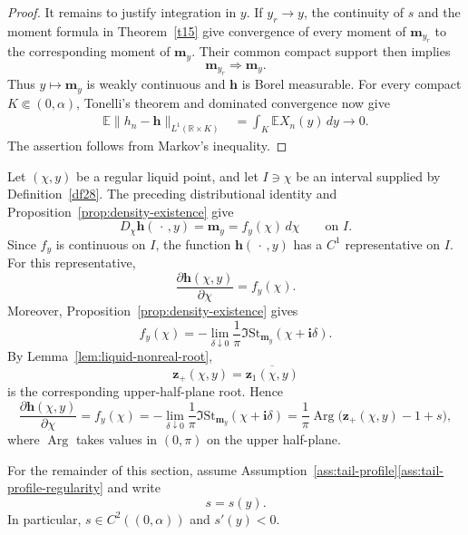 \documentclass[11pt]{amsart}
\theoremstyle{plain}
\numberwithin{equation}{section}
\numberwithin{theorem}{section}
\numberwithin{figure}{section}
\begin{document}
\begin{proof}
It remains to justify integration in \(y\). If \(y_r\to y\), the
continuity of \(s\) and the moment formula in Theorem~\ref{t15} give
convergence of every moment of \(\mathbf m_{y_r}\) to the corresponding
moment of \(\mathbf m_y\). Their common compact support then implies
\[
    \mathbf m_{y_r}\Longrightarrow\mathbf m_y.
\]
Thus \(y\mapsto\mathbf m_y\) is weakly continuous and
\(\mathbf h\) is Borel measurable. For every compact
\(K\Subset(0,\alpha)\), Tonelli's theorem and dominated convergence
now give
\[
\begin{aligned}
    \mathbb E
    \lVert h_n-\mathbf h\rVert_{L^1(\mathbb R\times K)}
    &=
    \int_K\mathbb E X_n(y)\,dy
    \longrightarrow0.
\end{aligned}
\]
The assertion follows from Markov's inequality.
\end{proof}



Let \((\chi,y)\) be a regular liquid point, and let \(I\ni\chi\)
be an interval supplied by Definition~\ref{df28}.  The preceding
distributional identity and Proposition~\ref{prop:density-existence}
give
\[
    D_\chi\mathbf h(\,\cdot\,,y)
    =
    \mathbf m_y
    =
    f_y(\chi)\,d\chi
    \qquad\text{on }I.
\]
Since \(f_y\) is continuous on \(I\), the function
\(\mathbf h(\,\cdot\,,y)\) has a \(C^1\) representative on \(I\).
For this representative,
\[
    \frac{\partial\mathbf h(\chi,y)}{\partial\chi}
    =
    f_y(\chi).
\]
Moreover, Proposition~\ref{prop:density-existence} gives
\[
    f_y(\chi)
    =
    -\lim_{\delta\downarrow0}
    \frac{1}{\pi}
    \Im\mathrm{St}_{\mathbf m_y}
    (\chi+\mathbf i\delta).
\]
By Lemma~\ref{lem:liquid-nonreal-root},
\[
    \mathbf z_+(\chi,y)
    =
    \overline{\mathbf z_1(\chi,y)}
\]
is the corresponding upper-half-plane root.  Hence
\begin{equation}
    \frac{\partial\mathbf h(\chi,y)}{\partial\chi}
    =
    f_y(\chi)
    =
    -\lim_{\delta\downarrow0}
    \frac{1}{\pi}
    \Im\mathrm{St}_{\mathbf m_y}
    (\chi+\mathbf i\delta)
    =
    \frac{1}{\pi}
    \operatorname{Arg}
    \bigl(\mathbf z_+(\chi,y)-1+s\bigr),
    \label{hnx}
\end{equation}
where \(\operatorname{Arg}\) takes values in \((0,\pi)\) on the upper
half-plane.

For the remainder of this section, assume
Assumption~\ref{ass:tail-profile}\ref{ass:tail-profile-regularity} and write
\[
    s=s(y).
\]
In particular, \(s\in C^2((0,\alpha))\) and \(s'(y)<0\).
\end{document}
